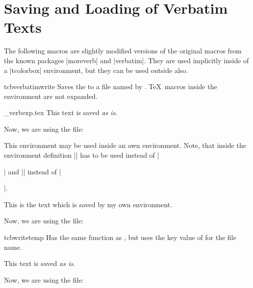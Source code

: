 \clearpage
\section{Saving and Loading of Verbatim Texts}%
%
The following macros are slightly modified versions of the original macros
from the known packages |moreverb| and |verbatim|.
They are used implicitly inside of a |tcolorbox| environment,
but they can be used outside also.
\enlargethispage*{1.5cm}

\begin{docEnvironment}{tcbverbatimwrite}{}
  Saves the  to a file named by .
  \TeX\ macros inside the environment are not expanded.
\begin{dispExample}
\begin{tcbverbatimwrite}{\jobname_verbexp.tex}
  This text is saved \textit{as is}.
\end{tcbverbatimwrite}

Now, we are using the file:\par

\end{dispExample}

This environment may be used inside an own environment. Note, that inside
the environment definition |\tcbverbatimwrite| has to be used instead of
|\begin{tcbverbatimwrite}| and |\endtcbverbatimwrite| instead of |\end{tcbverbatimwrite}|.
\begin{dispExample}
\newenvironment{myverbatim}{%
  \begingroup{}}%
  {\endtcbverbatimwrite\endgroup}

\begin{myverbatim}
  This is the text which is saved by my own environment.
\end{myverbatim}

Now, we are using the file:\par

\end{dispExample}
\end{docEnvironment}

\begin{docEnvironment}{tcbwritetemp}{}
  Has the same function as , but uses the key value
  of  for the file name.
\begin{dispExample}
\begin{tcbwritetemp}
  This text is saved \textit{as is}.
\end{tcbwritetemp}

Now, we are using the file:\par
\tcbusetemp
\end{dispExample}
\end{docEnvironment}


